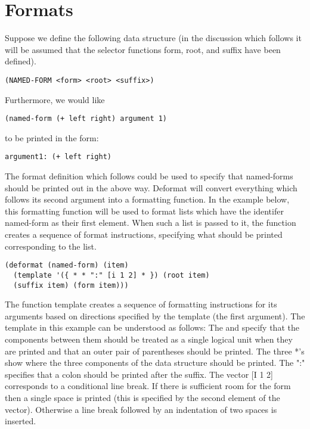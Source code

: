 \section{Formats}

  Suppose  we  define  the  following  data  structure  (in  the
discussion  which  follows  it will be assumed that the selector
functions form, root, and suffix have been defined).

\begin{verbatim}
(NAMED-FORM <form> <root> <suffix>)
\end{verbatim}
Furthermore, we would like

\begin{verbatim}
(named-form (+ left right) argument 1)
\end{verbatim}
to be printed in the form:
\begin{verbatim}
argument1: (+ left right)
\end{verbatim}
The format definition which follows could  be  used  to  specify
that  named-forms  should  be  printed  out  in  the  above way.
Deformat  will  convert  everything  which  follows  its  second
argument into a formatting function.  In the example below, this
formatting  function will be used to format lists which have the
identifer named-form as their first element.  When such  a  list
is  passed  to  it,  the  function  creates a sequence of format
instructions, specifying what should be printed corresponding to
the list.

\begin{verbatim}
(deformat (named-form) (item)
  (template '({ * * ":" [i 1 2] * }) (root item) 
  (suffix item) (form item)))
\end{verbatim}
The  function  template  creates  a   sequence   of   formatting
instructions  for its arguments based on directions specified by
the template (the first argument).  The template in this example
can be understood as follows: The  {  and  }  specify  that  the
components  between  them  should be treated as a single logical
unit when they are printed and that an outer pair of parentheses
should  be  printed.    The  three  *'s  show  where  the  three
components  of  the  data  structure should be printed.  The ":"
specifies that a colon should be printed after the  suffix.  The
vector  [I  1  2]  corresponds  to a conditional line break.  If
there is sufficient room for the form then  a  single  space  is
printed (this is specified by the second element of the vector).
Otherwise  a line break followed by an indentation of two spaces
is inserted.\\


